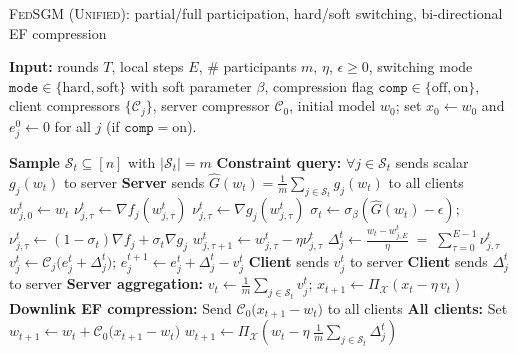 \documentclass{article} %
\def\C{{\mathcal C}}
\def\S{{\mathcal S}}
\begin{document}
\begin{algorithm}[t]
\caption{\textsc{FedSGM (Unified)}: partial/full participation, hard/soft switching, bi-directional EF compression}
\label{alg:fedsgm_unified}
\begin{flushleft}
\textbf{Input:} rounds $T$, local steps $E$, $\#$ participants $m$, $\eta$, $\epsilon \geq 0$, switching mode $\mathtt{mode} \in \{\text{hard}, \text{soft}\}$ with soft parameter $\beta$, compression flag $\mathtt{comp} \in \{\text{off}, \text{on}\}$, client compressors $\{\mathcal{C}_j\}$, server compressor $\mathcal{C}_0$, initial model $w_0$; set $x_0 \gets w_0$ and $e_j^0 \gets 0$ for all $j$ (if $\mathtt{comp} = \text{on}$).
\end{flushleft}
\vspace{-0.4cm}
\begin{multicols}{2}
\begin{algorithmic}[1]
  \State \textbf{Sample} $\S_t \subseteq [n]$ with $|\S_t|=m$ 
  \State \textbf{Constraint query:}  $\forall j\in \S_t$ sends scalar $g_j(w_t)$ to server
  \State \textbf{Server} sends $\hat G(w_t) =  \frac{1}{m}\!\sum_{j\in \S_t} g_j(w_t)$ to all clients
  \ForAll{$j\in \S_t$ \textbf{in parallel}}
    \State $w_{j,0}^t \gets w_t$
                    \State $\nu_{j,\tau}^t \gets \nabla f_j\!\left(w_{j,\tau}^t\right)$
                \Else
                    \State $\nu_{j,\tau}^t \gets \nabla g_j\!\left(w_{j,\tau}^t\right)$
                \EndIf
            \Else
                \State $\sigma_t \gets \sigma_\beta(\hat{G}(w_t) - \epsilon);$
                \State $\nu_{j,\tau}^t \gets (1-\sigma_t)\nabla f_j + \sigma_t \nabla g_j$
            \EndIf
            \State $w_{j,\tau+1}^t \gets w_{j,\tau}^t - \eta \nu_{j,\tau}^t$
        \EndFor
    \State $\Delta_j^t \gets \frac{w_t - w_{j,E}^t}{\eta} \;=\; \sum_{\tau=0}^{E-1}\nu_{j,\tau}^t$
        \State $v_j^t \gets \C_j\big(e_j^t + \Delta_j^t\big)$;
        \State $e_j^{t+1} \gets e_j^t + \Delta_j^t - v_j^t$ 
        \State \textbf{Client} sends $v_j^t$ to server
    \Else
        \State \textbf{Client} sends $\Delta_j^t$ to server
    \EndIf
  \EndFor
  \State \textbf{Server aggregation:}
     \State $v_t \gets \frac{1}{m}\sum_{j\in \S_t} v_j^t$;  
     \State $x_{t+1} \gets \Pi_\mathcal{X}\left(x_t - \eta\, v_t\right)$
     \State \textbf{Downlink EF compression:} 
     \State Send $\C_0\!\big(x_{t+1} - w_t\big)$ to all clients
     \State \textbf{All clients:} 
     \State Set  $w_{t+1} \gets w_t + \mathcal C_0\!\big(x_{t+1} - w_t\big)$
        \Else 
     \State $w_{t+1} \gets \Pi_\mathcal{X}\left(w_t - \eta\;\frac{1}{m}\sum_{j\in \S_t} \Delta_j^t\right)$
  \EndIf
\EndFor
\end{algorithmic}
\end{multicols}
\end{algorithm}
\end{document}

